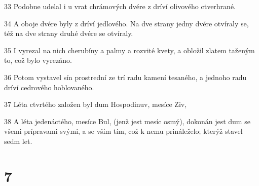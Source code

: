 \par 33 Podobne udelal i u vrat chrámových dvére z dríví olivového ctverhrané.
\par 34 A oboje dvére byly z dríví jedlového. Na dve strany jedny dvére otvíraly se, též na dve strany druhé dvére se otvíraly.
\par 35 I vyrezal na nich cherubíny a palmy a rozvité kvety, a obložil zlatem taženým to, což bylo vyrezáno.
\par 36 Potom vystavel sín prostrední ze trí radu kamení tesaného, a jednoho radu dríví cedrového hoblovaného.
\par 37 Léta ctvrtého založen byl dum Hospodinuv, mesíce Ziv,
\par 38 A léta jedenáctého, mesíce Bul, (jenž jest mesíc osmý), dokonán jest dum se všemi prípravami svými, a se vším tím, což k nemu prináleželo; kterýž stavel sedm let.

\chapter{7}

